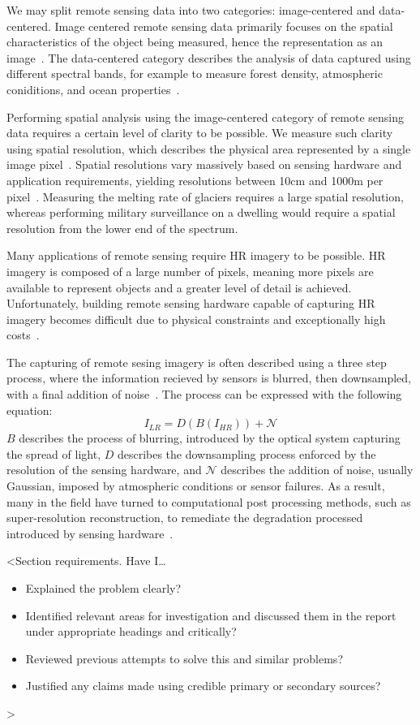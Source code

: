 We may split remote sensing data into two categories: image-centered and data-centered. Image centered remote sensing data primarily focuses on the spatial characteristics of the object being measured, hence the representation as an image~\cite{remoteSensingImageProcessing}. The data-centered category describes the analysis of data captured using different spectral bands, for example to measure forest density, atmospheric coniditions, and ocean properties~\cite{remoteSensingImageProcessing}.

Performing spatial analysis using the image-centered category of remote sensing data requires a certain level of clarity to be possible. We measure such clarity using spatial resolution, which describes the physical area represented by a single image pixel~\cite{ref}. Spatial resolutions vary massively based on sensing hardware and application requirements, yielding resolutions between 10cm and 1000m per pixel~\cite{remoteSensing,remoteSensingImageProcessing}. Measuring the melting rate of glaciers requires a large spatial resolution, whereas performing military surveillance on a dwelling would require a spatial resolution from the lower end of the spectrum.

Many applications of remote sensing require HR imagery to be possible. HR imagery is composed of a large number of pixels, meaning more pixels are available to represent objects and a greater level of detail is achieved. Unfortunately, building remote sensing hardware capable of capturing HR imagery becomes difficult due to physical constraints and exceptionally high costs~\cite{ref}. 

The capturing of remote sesing imagery is often described using a three step process, where the information recieved by sensors is blurred, then downsampled, with a final addition of noise~\cite{superResRemoteSensingOverview, superResRemoteSensingChallenges, remoteSensingDeepLearningReview, remoteSensingGANsReview}. The process can be expressed with the following equation:
\[I_{LR} = D(B(I_{HR})) + \mathcal{N}\]
$B$ describes the process of blurring, introduced by the optical system capturing the spread of light, $D$ describes the downsampling process enforced by the resolution of the sensing hardware, and $\mathcal{N}$ describes the addition of noise, usually Gaussian, imposed by atmospheric conditions or sensor failures. As a result, many in the field have turned to computational post processing methods, such as super-resolution reconstruction, to remediate the degradation processed introduced by sensing hardware~\cite{superResRemoteSensingOverview}. 

<Section requirements. Have I\dots
\begin{itemize}
    \item Explained the problem clearly?
    \item Identified relevant areas for investigation and discussed them in the report under appropriate headings and critically?
    \item Reviewed previous attempts to solve this and similar problems?
    \item Justified any claims made using credible primary or secondary sources?
\end{itemize}
>